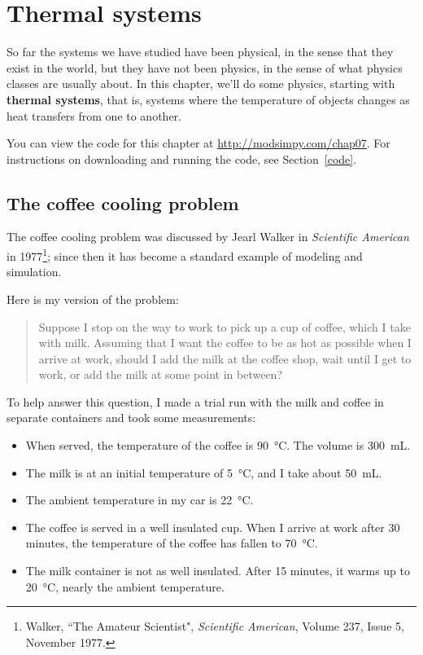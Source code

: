 \documentclass[12pt]{book}
\theoremstyle{exercise}
\begin{document}
\chapter{Thermal systems}

So far the systems we have studied have been physical, in the sense that they exist in the world, but they have not been physics, in the sense of what physics classes are usually about.  In this chapter, we'll do some physics, starting with {\bf thermal systems}, that is, systems where the temperature of objects changes as heat transfers from one to another.

You can view the code for this chapter at \url{http://modsimpy.com/chap07}.  For instructions on downloading and running the code, see Section~\ref{code}.

\section{The coffee cooling problem}

The coffee cooling problem was discussed by Jearl Walker in {\it Scientific American} in 1977\footnote{Walker, ``The Amateur Scientist", {\it Scientific American}, Volume 237, Issue 5, November 1977.}; since then it has become a standard example of modeling and simulation.

Here is my version of the problem:

\begin{quote}
Suppose I stop on the way to work to pick up a cup of coffee, which I take with milk.  Assuming that I want the coffee to be as hot as possible when I arrive at work, should I add the milk at the coffee shop, wait until I get to work, or add the milk at some point in between?
\end{quote}

To help answer this question, I made a trial run with the milk and coffee in separate containers and took some measurements:

\begin{itemize}

\item When served, the temperature of the coffee is \SI{90}{\celsius}.  The volume is \SI{300}{mL}.

\item The milk is at an initial temperature of \SI{5}{\celsius}, and I take about \SI{50}{mL}.

\item The ambient temperature in my car is \SI{22}{\celsius}.

\item The coffee is served in a well insulated cup.  When I arrive at work after 30 minutes, the temperature of the coffee has fallen to \SI{70}{\celsius}.

\item The milk container is not as well insulated.  After 15 minutes, it warms up to \SI{20}{\celsius}, nearly the ambient temperature.

\end{itemize}
\end{document}

